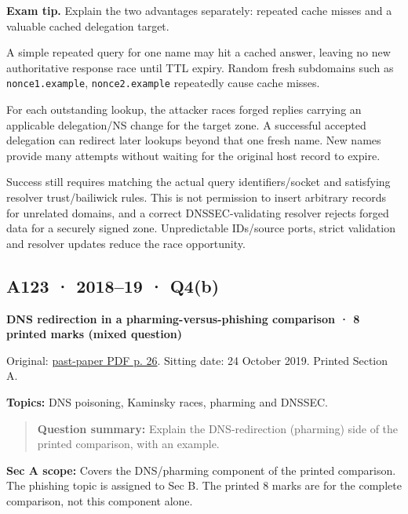 \documentclass[11pt,a4paper]{article}
\begin{document}
{\color{ForestGreen}\textbf{Exam tip.} Explain the two advantages separately: repeated cache misses and a valuable cached delegation target.}


A simple repeated query for one name may hit a cached answer,\allowbreak{} leaving no new authoritative response race until TTL expiry. Random fresh subdomains such as \texttt{nonce1.example},\allowbreak{} \texttt{nonce2.example} repeatedly cause cache misses.


For each outstanding lookup,\allowbreak{} the attacker races forged replies carrying an applicable delegation/\allowbreak{}NS change for the target zone. A successful accepted delegation can redirect later lookups beyond that one fresh name. New names provide many attempts without waiting for the original host record to expire.


Success still requires matching the actual query identifiers/\allowbreak{}socket and satisfying resolver trust/\allowbreak{}bailiwick rules. This is not permission to insert arbitrary records for unrelated domains,\allowbreak{} and a correct DNSSEC-validating resolver rejects forged data for a securely signed zone. Unpredictable IDs/\allowbreak{}source ports,\allowbreak{} strict validation and resolver updates reduce the race opportunity.




\clearpage
\subsection{A123 · 2018–19 · Q4(b)}\label{a123}

\textbf{DNS redirection in a pharming-versus-phishing comparison · 8 printed marks (mixed question)}


Original: \href{../../CSE405-Security_Merged.pdf\#page=26}{past-paper PDF p. 26}. Sitting date: 24 October 2019. Printed Section A.


\textbf{Topics:} DNS poisoning,\allowbreak{} Kaminsky races,\allowbreak{} pharming and DNSSEC.



\begin{quote}\small

\textbf{Question summary:} Explain the DNS-redirection (pharming) side of the printed comparison,\allowbreak{} with an example.



\end{quote}

\textbf{Sec A scope:} Covers the DNS/\allowbreak{}pharming component of the printed comparison. The phishing topic is assigned to Sec B. The printed 8 marks are for the complete comparison,\allowbreak{} not this component alone.
\end{document}

